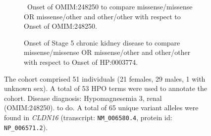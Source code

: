 \begin{figure}[htbp]
\vspace{2em}

\begin{subfigure}[b]{0.95\textwidth}
\captionsetup{justification=raggedright,singlelinecheck=false}
\caption{ Onset of OMIM:248250 to compare missense/missense OR missense/other and other/other with respect to Onset of OMIM:248250. }
\end{subfigure}

\vspace{2em}

\begin{subfigure}[b]{0.95\textwidth}
\captionsetup{justification=raggedright,singlelinecheck=false}
\caption{Onset of Stage 5 chronic kidney disease to compare missense/missense OR missense/other and other/other with respect to Onset of HP:0003774. }
\end{subfigure}

\vspace{2em}

\caption{ The cohort comprised 51 individuals (21 females, 29 males, 1 with unknown sex). A total of 53 HPO terms were used to annotate the cohort. Disease diagnosis: Hypomagnesemia 3, renal (OMIM:248250). to do. A total of 65 unique variant alleles were found in \textit{CLDN16} (transcript: \texttt{NM\_006580.4}, protein id: \texttt{NP\_006571.2}).}
\end{figure}
